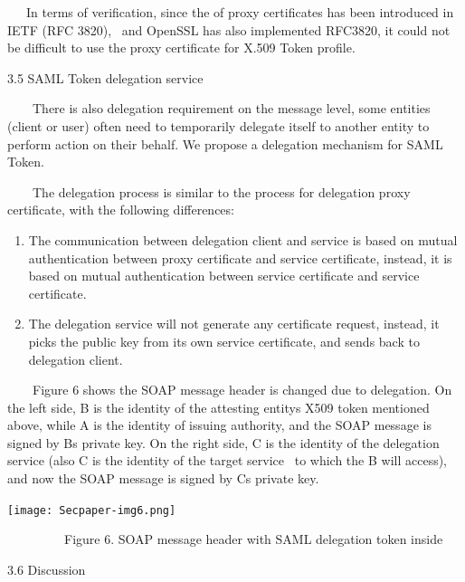 \documentclass{article}
\newcommand\liststyleLv{%
\renewcommand\theenumi{\arabic{enumi}}
\renewcommand\theenumii{\arabic{enumii}}
\renewcommand\theenumiii{\arabic{enumiii}}
\renewcommand\theenumiv{\arabic{enumiv}}
\renewcommand\labelenumi{\theenumi.}
\renewcommand\labelenumii{\theenumii.}
\renewcommand\labelenumiii{\theenumiii.}
\renewcommand\labelenumiv{\theenumiv.}
}
\begin{document}
\ \ \ In terms of verification, since the of proxy certificates has been
introduced in IETF (RFC 3820), \ and OpenSSL has also implemented
RFC3820, it could not be difficult to use the proxy certificate for
X.509 Token profile.


\bigskip

3.5 SAML Token delegation service

\ \ \ \ There is also delegation requirement on the message level, some
entities (client or user) often need to temporarily delegate itself to
another entity to perform action on their behalf. We propose a
delegation mechanism for SAML Token. 

\ \ \ \ The delegation process is similar to the process for delegation
proxy certificate, with the following differences:

\liststyleLv
\begin{enumerate}
\item The communication between delegation client and service is based
on mutual authentication between proxy certificate and service
certificate, instead, it is based on mutual authentication between
service certificate and service certificate.
\item The delegation service will not generate any certificate request,
instead, it picks the public key from its own service certificate, and
sends back to delegation client.
\end{enumerate}
\ \ \ \ Figure 6 shows the SOAP message header is changed due to
delegation. On the left side, B is the identity of the attesting
entity{\textquotesingle}s X509 token mentioned above, while A is the
identity of issuing authority, and the SOAP message is signed by
B{\textquotesingle}s private key. On the right side, C is the identity
of the delegation service (also C is the identity of the target service
\ to which the B will access), and now the SOAP message is signed by
C{\textquotesingle}s private key.


\bigskip



\begin{center}
\texttt{[image: Secpaper-img6.png]}
\end{center}
{\centering
\ \ \ \ \ \ \ \ \ Figure 6. SOAP message header with SAML delegation
token inside
\par}


\bigskip

3.6 Discussion


\bigskip
\end{document}
